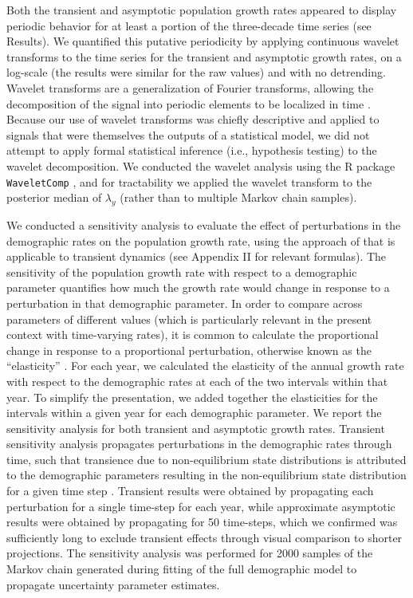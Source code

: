\documentclass[11pt]{article}
\begin{document}
Both the transient and asymptotic population growth rates appeared to display periodic
behavior for at least a portion of the three-decade time series (see Results).
We quantified this putative periodicity by applying continuous wavelet transforms to 
the time series for the transient and asymptotic growth rates, 
on a log-scale (the results were similar for the raw values) 
and with no detrending.
Wavelet transforms are a generalization of Fourier transforms,
allowing the decomposition of the signal into periodic elements to be localized in time
\citep{cazelles2008wavelet}. 
Because our use of wavelet transforms was chiefly descriptive and applied to signals 
that were themselves the outputs of a statistical model,
we did not attempt to apply formal statistical inference (i.e., hypothesis testing)
to the wavelet decomposition.
We conducted the wavelet analysis using the R package \texttt{WaveletComp}
\citep{waveletcomp2018},
and for tractability we applied the wavelet transform 
to the posterior median of $\lambda_y$ (rather than to multiple Markov chain samples).

We conducted a sensitivity analysis
to evaluate the effect of perturbations 
in the demographic rates on the population growth rate, 
using the approach of \cite{caswell2007sensitivity} 
that is applicable to transient dynamics
(see Appendix II for relevant formulas). 
The sensitivity of the population growth rate with respect to a demographic parameter
quantifies how much the growth rate would change in response to a perturbation in that 
demographic parameter. 
In order to compare across parameters of different values 
(which is particularly relevant in the present context with time-varying rates),
it is common to calculate the proportional change in  
response to a proportional perturbation,
otherwise known as the ``elasticity''  \citep{caswell2001matrix}.
For each year, we calculated the elasticity of the annual growth rate with respect
to the demographic rates at each of the two intervals within that year.
To simplify the presentation, 
we added together the  elasticities for the intervals within a given year 
for each demographic parameter.
We report the sensitivity analysis for both transient and asymptotic growth rates.
Transient sensitivity analysis propagates perturbations in the demographic rates 
through time, 
such that transience due to non-equilibrium state distributions is attributed to the
demographic parameters resulting in the non-equilibrium state distribution 
for a given time step \citep{caswell2007sensitivity}.
Transient results were obtained by propagating each perturbation for
a single time-step for each year,
while approximate asymptotic results were obtained by propagating for 50 time-steps,
which we confirmed was sufficiently long to exclude transient effects 
through visual comparison to shorter projections.
The sensitivity analysis was performed for 2000 samples of the Markov chain generated 
during fitting of the full demographic model to propagate uncertainty parameter estimates.
\end{document}
